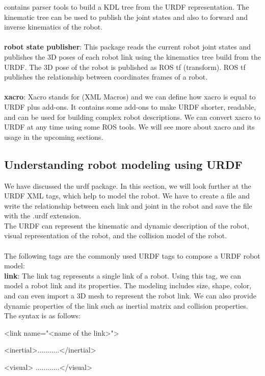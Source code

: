 \documentclass[a4paper]{article}
\begin{document}
contains parser tools to build a KDL tree from the URDF representation. The kinematic 
tree can be used to publish the joint states and also to forward and inverse 
kinematics of the robot.
\\\\\textbf{robot state publisher}: This package reads the current robot joint states 
and publishes 
the 3D poses of each robot link using the kinematics tree build from the URDF. The 3D 
pose of the robot is published as ROS tf (transform). ROS tf publishes the 
relationship 
between coordinates frames of a robot.
\\\\\textbf{xacro}: Xacro stands for (XML Macros) and we can define how xacro is equal 
to URDF plus add-ons. It contains some add-ons to make URDF shorter, readable, and can 
be used for building complex robot descriptions. We can convert xacro to URDF at any 
time using some ROS tools. We will see more about xacro and its usage in the upcoming 
sections.

\subsection{Understanding robot modeling using URDF}

We have discussed the urdf package. In this section, we will look further at the URDF XML tags, which help to model the robot. We have to create a file and write the relationship between each link and joint in the robot and save the file with the .urdf extension.
\\The URDF can represent the kinematic and dynamic description of the robot, visual representation of the robot, and the collision model of the robot.
\\\\The following tags are the commonly used URDF tags to compose a URDF robot model:
\\ \textbf{link}: The link tag represents a single link of a robot. Using this tag, we can model a robot link and its properties. The modeling includes size, shape, color, and can even import a 3D mesh to represent the robot link. We can also provide dynamic properties of the link such as inertial matrix and collision properties.
\\
The syntax is as follows:

<link name="<name of the link>">

<inertial>...........</inertial>

  <visual> ............</visual>
\end{document}
